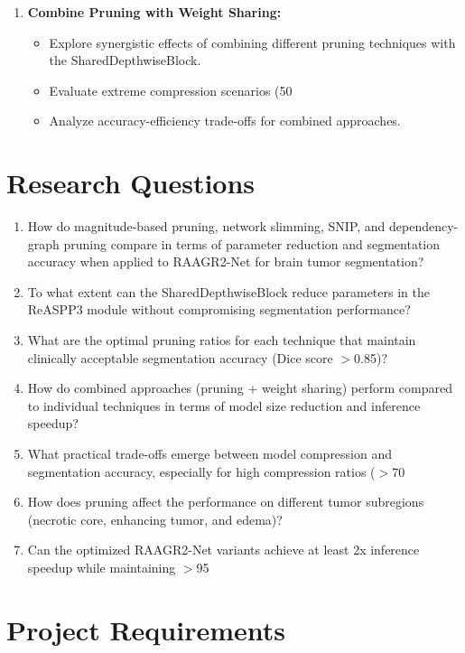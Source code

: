 \documentclass[conference]{IEEEtran}
\begin{document}
\begin{enumerate}[label=\textbf{\arabic*.}]
    \item \textbf{Combine Pruning with Weight Sharing:}
    \begin{itemize}[label=--]
        \item Explore synergistic effects of combining different pruning techniques with the SharedDepthwiseBlock.
        \item Evaluate extreme compression scenarios (50%
        \item Analyze accuracy-efficiency trade-offs for combined approaches.
    \end{itemize}
\end{enumerate}

\section{Research Questions}
\begin{enumerate}[label=\textbf{\arabic*.}]
    \item How do magnitude-based pruning, network slimming, SNIP, and dependency-graph pruning compare in terms of parameter reduction and segmentation accuracy when applied to RAAGR2-Net for brain tumor segmentation?
    \item To what extent can the SharedDepthwiseBlock reduce parameters in the ReASPP3 module without compromising segmentation performance?
    \item What are the optimal pruning ratios for each technique that maintain clinically acceptable segmentation accuracy (Dice score $>$0.85)?
    \item How do combined approaches (pruning + weight sharing) perform compared to individual techniques in terms of model size reduction and inference speedup?
    \item What practical trade-offs emerge between model compression and segmentation accuracy, especially for high compression ratios ($>$70%
    \item How does pruning affect the performance on different tumor subregions (necrotic core, enhancing tumor, and edema)?
    \item Can the optimized RAAGR2-Net variants achieve at least 2x inference speedup while maintaining $>$95%
\end{enumerate}

\section{Project Requirements}
\end{document}

